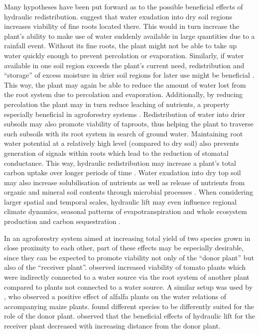 Many hypotheses have been put forward as to the possible beneficial effects of hydraulic redistribution.  \textcite{burgess_redistribution_1998} suggest that water exudation into dry soil regions increases viability of fine roots located there.  This would in turn increase the plant’s ability to make use of water suddenly available in large quantities due to a rainfall event.  Without its fine roots, the plant might not be able to take up water quickly enough to prevent percolation or evaporation.  Similarly, if water available in one soil region exceeds the plant’s current need, redistribution and ``storage'' of excess moisture in drier soil regions for later use might be beneficial \parencite{richards_hydraulic_1987}.  This way, the plant may again be able to reduce the amount of water lost from the root system due to percolation and evaporation.  Additionally, by reducing percolation the plant may in turn reduce leaching of nutrients, a property especially beneficial in agroforestry systems \parencite{burgess_redistribution_1998}.  Redistribution of water into drier subsoils may also promote viability of taproots, thus helping the plant to traverse such subsoils with its root system in search of ground water.  Maintaining root water potential at a relatively high level (compared to dry soil) also prevents generation of signals within roots which lead to the reduction of stomatal conductance.  This way, hydraulic redistribution may increase a plant’s total carbon uptake over longer periods of time \parencite{warren_hydraulic_2007}.  Water exudation into dry top soil may also increase solubilisation of nutrients as well as release of nutrients from organic and mineral soil contents through microbial processes \parencite{pate_assessing_1999,ryel_hydraulic_2002}.  When considering larger spatial and temporal scales, hydraulic lift may even influence regional climate dynamics, seasonal patterns of evapotranspiration and whole ecosystem production and carbon sequestration \parencite{warren_hydraulic_2007}.

In an agroforestry system aimed at increasing total yield of two species grown in close proximity to each other, part of these effects may be especially desirable, since they can be expected to promote viability not only of the ``donor plant'' but also of the ``receiver plant''.  \textcite{bormann_moisture_1957} observed increased viability of tomato plants which were indirectly connected to a water source via the root system of another plant compared to plants not connected to a water source.  A similar setup was used by \textcite{corak_water_1987}, who observed a positive effect of alfalfa plants on the water relations of accompanying maize plants.  \textcite{sekiya_applying_2011} found different species to be differently suited for the role of the donor plant.  \textcite{sekiya_pigeon_2004} observed that the beneficial effects of hydraulic lift for the receiver plant decreased with increasing distance from the donor plant.  


